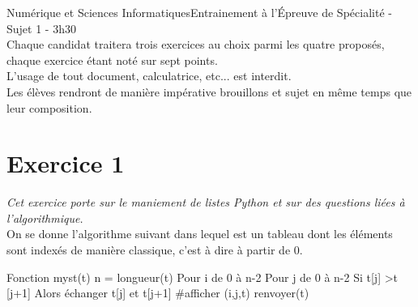 \documentclass[11pt,a4paper,french,twoside]{PMCours}
\begin{document}
{Numérique et Sciences Informatiques}{Entrainement à l'\'Epreuve de Spécialité - Sujet 1 - 3h30}
\ \medskip\\
{\large Chaque candidat traitera trois exercices au choix parmi les quatre proposés, chaque exercice étant noté sur sept points.\medskip\\
L'usage de tout document, calculatrice, etc... est interdit. \medskip\\
Les élèves rendront de manière impérative brouillons et sujet en même temps que leur composition.}


%
%
%
%
\newpage\noindent
\section*{Exercice 1}
\emph{Cet exercice porte sur le maniement de listes Python et sur des questions liées à l'algorithmique.}\medskip\\
On se donne l'algorithme suivant dans lequel  est un tableau dont les éléments sont indexés de manière classique, c'est à dire à partir de $0$.\ \\
\begin{Python}
Fonction myst(t)
n = longueur(t)
Pour i de 0 à n-2
	Pour j de 0 à n-2
		Si t[j] >t [j+1]
		Alors
			échanger t[j] et t[j+1]
			#afficher (i,j,t)
renvoyer(t)
\end{Python}
\end{document}
